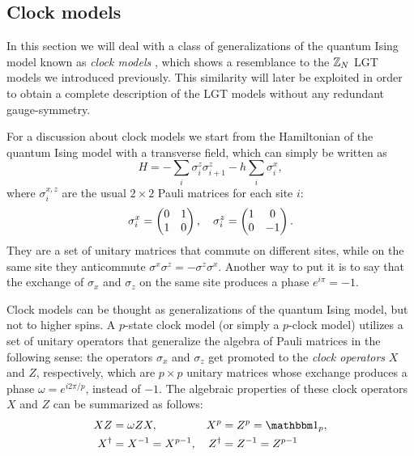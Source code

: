 \subsection{Clock models}%
\label{sub:clock_models}

In this section we will deal with a class of generalizations of the quantum Ising model known as \emph{clock models} \cite{fendley2014parafermions, baxter1989clock}, which shows a resemblance to the $\mathbb{Z}_N$ LGT models we introduced previously.
This similarity will later be exploited in order to obtain a complete description of the LGT models without any redundant gauge-symmetry.

For a discussion about clock models we start from the Hamiltonian of the quantum Ising model with a transverse field, which can simply be written as
\begin{equation}
    H = - \sum_{i} \sigma^z_i \sigma^z_{i+1} - h \sum_{i} \sigma^x_i,
    \label{eq:ising_hamiltonian_duality}
\end{equation}
where $\sigma^{x,z}_i$ are the usual $2 \times 2$ Pauli matrices for each site $i$:
\begin{equation}
    \sigma^x_i = \pmqty{ 0 & 1 \\ 1 &  0 }, \quad
    \sigma^z_i = \pmqty{ 1 & 0 \\ 0 & -1 }.
\end{equation}
They are a set of unitary matrices that commute on different sites, while on the same site they anticommute $\sigma^x \sigma^z = - \sigma^z \sigma^x$.
Another way to put it is to say that the exchange of $\sigma_x$ and $\sigma_z$ on the same site produces a phase $e^{i \pi} = -1$.

Clock models can be thought as generalizations of the quantum Ising model, but not to higher spins.
A $p$-state clock model (or simply a $p$-clock model) utilizes a set of unitary operators that generalize the algebra of Pauli matrices in the following sense:
the operators $\sigma_x$ and $\sigma_z$ get promoted to the \emph{clock operators} $X$ and $Z$, respectively, which are $p \times p$ unitary matrices whose exchange produces a phase $\omega = e^{i 2 \pi / p}$, instead of $-1$.
The algebraic properties of these clock operators $X$ and $Z$ can be summarized as follows:
\begin{equation}
    \begin{aligned}
        X Z & = \omega Z X, &
        X^p & =  Z^p = \identity_p, \\
        X^\dagger & = X^{-1} = X^{p-1}, &
        Z^\dagger & = Z^{-1} = Z^{p-1}
    \end{aligned}
    \label{eq:clock_operator_algebra}
\end{equation}

